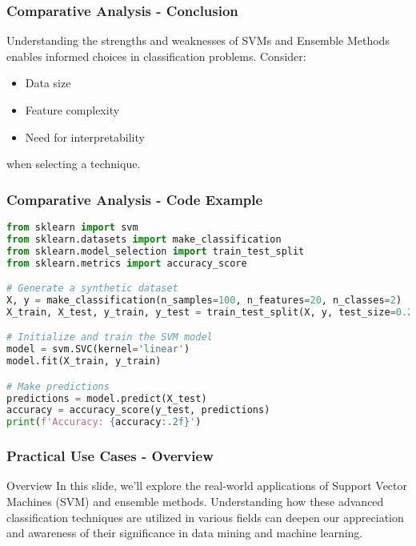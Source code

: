 \documentclass[aspectratio=169]{beamer}
\begin{document}
\begin{frame}
    \frametitle{Comparative Analysis - Conclusion}
    Understanding the strengths and weaknesses of SVMs and Ensemble Methods enables informed choices in classification problems. Consider:
    \begin{itemize}
        \item Data size
        \item Feature complexity
        \item Need for interpretability
    \end{itemize}
    when selecting a technique.
\end{frame}

\begin{frame}[fragile]
    \frametitle{Comparative Analysis - Code Example}
    \begin{lstlisting}[language=Python]
from sklearn import svm
from sklearn.datasets import make_classification
from sklearn.model_selection import train_test_split
from sklearn.metrics import accuracy_score

# Generate a synthetic dataset
X, y = make_classification(n_samples=100, n_features=20, n_classes=2)
X_train, X_test, y_train, y_test = train_test_split(X, y, test_size=0.2)

# Initialize and train the SVM model
model = svm.SVC(kernel='linear')
model.fit(X_train, y_train)

# Make predictions
predictions = model.predict(X_test)
accuracy = accuracy_score(y_test, predictions)
print(f'Accuracy: {accuracy:.2f}')
    \end{lstlisting}
\end{frame}

\begin{frame}[fragile]
    \frametitle{Practical Use Cases - Overview}
    \begin{block}{Overview}
        In this slide, we'll explore the real-world applications of Support Vector Machines (SVM) and ensemble methods. 
        Understanding how these advanced classification techniques are utilized in various fields can deepen our appreciation and awareness 
        of their significance in data mining and machine learning.
    \end{block}
\end{frame}
\end{document}
